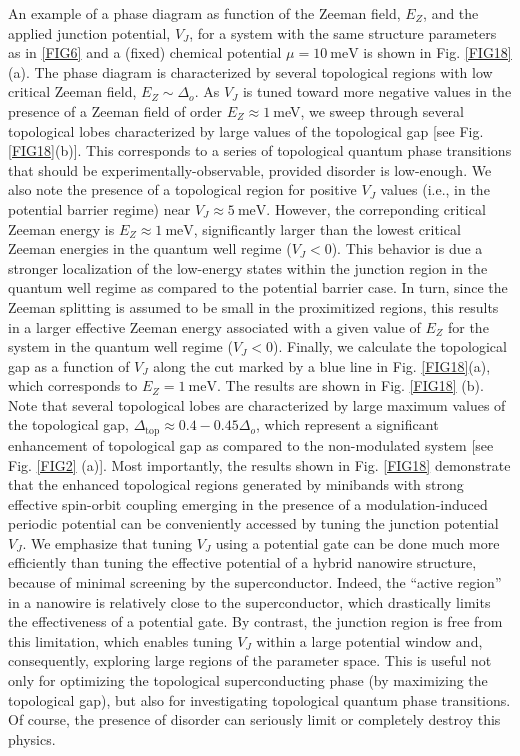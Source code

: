 \documentclass[twocolumn,aps,prb,nofootinbib]{revtex4-2}
\begin{document}
An example of a phase diagram as function of the Zeeman field, $E_Z$, and the applied junction potential, $V_J$, for a system with the same structure parameters as in \ref{FIG6} and a (fixed) chemical potential  $\mu = 10~\text{meV}$ is shown in Fig. \ref{FIG18} (a). The phase diagram is characterized by several topological regions with low critical Zeeman field, $E_Z \sim \Delta_o$. As $V_J$ is tuned toward more negative values in the presence of a Zeeman field of order $E_Z\approx 1~$meV, we  sweep through several topological lobes characterized by large values of the topological gap [see Fig. \ref{FIG18}(b)]. This corresponds to a series of topological quantum phase transitions that should be experimentally-observable, provided disorder is low-enough. We also note the presence of a topological region for positive $V_J$ values (i.e., in the potential barrier regime) near $V_J \approx 5~\text{meV}$.  However, the correponding critical Zeeman energy is $E_Z \approx 1~\text{meV}$, significantly larger than the lowest critical Zeeman energies in the quantum well regime ($V_J <0$). This behavior is due a stronger localization of the low-energy states within the junction region in the quantum well regime as compared to the potential barrier case. In turn, since the Zeeman splitting is assumed to be small in the proximitized regions, this results in a larger effective Zeeman energy associated with a given value of $E_Z$ for the system in the quantum well regime ($V_J < 0$). 
Finally, we calculate the topological gap as a function of $V_J$ along the cut marked by a blue line in Fig. \ref{FIG18}(a), which corresponds to $E_Z = 1~\text{meV}$. The results are shown in Fig. \ref{FIG18} (b). Note that several topological lobes are characterized by large maximum values of the  topological gap, $\Delta_{\text{top}} \approx 0.4 - 0.45\Delta_o$, which represent a significant enhancement of topological gap as compared to the non-modulated system [see Fig. \ref{FIG2} (a)]. Most importantly, the results shown in Fig. \ref{FIG18} demonstrate that the enhanced topological regions generated  by minibands with strong effective spin-orbit coupling emerging  in the presence of a modulation-induced periodic potential can be conveniently accessed by tuning the junction potential $V_J$. We emphasize that tuning $V_J$ using a potential gate can be done much more efficiently than tuning the effective potential of a hybrid nanowire structure, because of minimal screening by the superconductor. Indeed, the ``active region'' in a nanowire is relatively close to the superconductor, which drastically limits the effectiveness of a potential gate. By contrast, the junction region is free from this limitation, which enables tuning $V_J$ within a large potential window and, consequently, exploring large regions of the parameter space. This is useful not only for optimizing the topological superconducting phase (by maximizing the topological gap), but also for investigating topological quantum phase transitions. Of course, the presence of disorder can seriously limit or completely destroy this physics.
\end{document}
